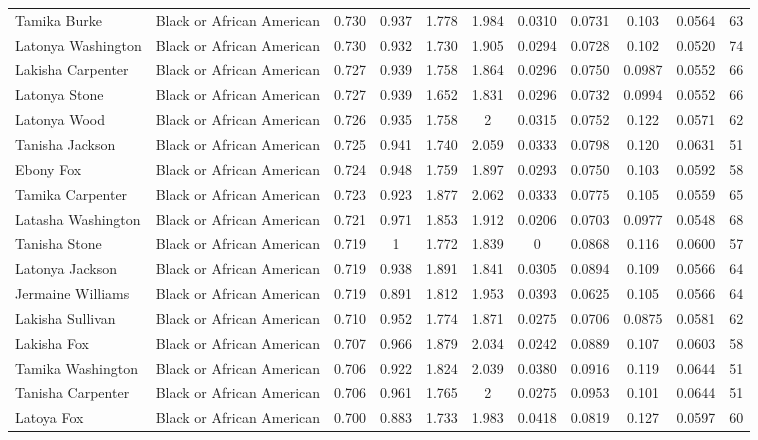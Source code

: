 \documentclass[]{article}
\begin{document}
\begin{tabular}{lcccccccccc}
Tamika Burke & Black or African American & 0.730 & 0.937 & 1.778 & 1.984 & 0.0310 & 0.0731 & 0.103 & 0.0564 & 63 \\
Latonya Washington & Black or African American & 0.730 & 0.932 & 1.730 & 1.905 & 0.0294 & 0.0728 & 0.102 & 0.0520 & 74 \\
Lakisha Carpenter & Black or African American & 0.727 & 0.939 & 1.758 & 1.864 & 0.0296 & 0.0750 & 0.0987 & 0.0552 & 66 \\
Latonya Stone & Black or African American & 0.727 & 0.939 & 1.652 & 1.831 & 0.0296 & 0.0732 & 0.0994 & 0.0552 & 66 \\
Latonya Wood & Black or African American & 0.726 & 0.935 & 1.758 & 2 & 0.0315 & 0.0752 & 0.122 & 0.0571 & 62 \\
Tanisha Jackson & Black or African American & 0.725 & 0.941 & 1.740 & 2.059 & 0.0333 & 0.0798 & 0.120 & 0.0631 & 51 \\
Ebony Fox & Black or African American & 0.724 & 0.948 & 1.759 & 1.897 & 0.0293 & 0.0750 & 0.103 & 0.0592 & 58 \\
Tamika Carpenter & Black or African American & 0.723 & 0.923 & 1.877 & 2.062 & 0.0333 & 0.0775 & 0.105 & 0.0559 & 65 \\
Latasha Washington & Black or African American & 0.721 & 0.971 & 1.853 & 1.912 & 0.0206 & 0.0703 & 0.0977 & 0.0548 & 68 \\
Tanisha Stone & Black or African American & 0.719 & 1 & 1.772 & 1.839 & 0 & 0.0868 & 0.116 & 0.0600 & 57 \\
Latonya Jackson & Black or African American & 0.719 & 0.938 & 1.891 & 1.841 & 0.0305 & 0.0894 & 0.109 & 0.0566 & 64 \\
Jermaine Williams & Black or African American & 0.719 & 0.891 & 1.812 & 1.953 & 0.0393 & 0.0625 & 0.105 & 0.0566 & 64 \\
Lakisha Sullivan & Black or African American & 0.710 & 0.952 & 1.774 & 1.871 & 0.0275 & 0.0706 & 0.0875 & 0.0581 & 62 \\
Lakisha Fox & Black or African American & 0.707 & 0.966 & 1.879 & 2.034 & 0.0242 & 0.0889 & 0.107 & 0.0603 & 58 \\
Tamika Washington & Black or African American & 0.706 & 0.922 & 1.824 & 2.039 & 0.0380 & 0.0916 & 0.119 & 0.0644 & 51 \\
Tanisha Carpenter & Black or African American & 0.706 & 0.961 & 1.765 & 2 & 0.0275 & 0.0953 & 0.101 & 0.0644 & 51 \\
Latoya Fox & Black or African American & 0.700 & 0.883 & 1.733 & 1.983 & 0.0418 & 0.0819 & 0.127 & 0.0597 & 60 \\

\end{tabular}
\end{document}
